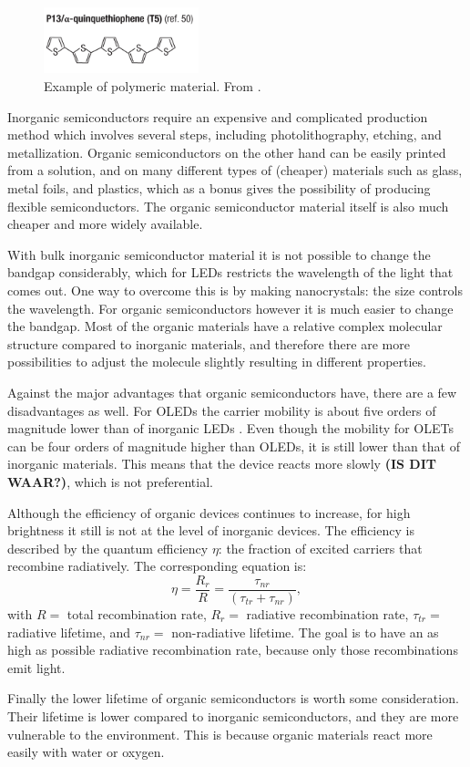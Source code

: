 \begin{figure}[!ht]
 \begin{center}
  \includegraphics[width=0.4\textwidth]{zwavelbenzeen}
  \caption{Example of polymeric material. From \citet{Muccini}.}
  \label{fig:LET}
 \end{center}
\end{figure}

Inorganic semiconductors require an expensive and complicated production method which involves several steps, including photolithography, etching, and metallization. Organic semiconductors on the other hand can be easily printed from a solution, and on many different types of (cheaper) materials such as glass, metal foils, and plastics, which as a bonus gives the possibility of producing flexible semiconductors. The organic semiconductor material itself is also much cheaper and more widely available.

With bulk inorganic semiconductor material it is not possible to change the bandgap considerably, which for LEDs restricts the wavelength of the light that comes out. One way to overcome this is by making nanocrystals: the size controls the wavelength. For organic semiconductors however it is much easier to change the bandgap. Most of the organic materials have a relative complex molecular structure compared to inorganic materials, and therefore there are more possibilities to adjust the molecule slightly resulting in different properties.

Against the major advantages that organic semiconductors have, there are a few disadvantages as well. For OLEDs the carrier mobility is about five orders of magnitude lower than of inorganic LEDs \citep{Muccini}. Even though the mobility for OLETs can be four orders of magnitude higher than OLEDs, it is still lower than that of inorganic materials. This means that the device reacts more slowly \textbf{(IS DIT WAAR?)}, which is not preferential.

Although the efficiency of organic devices continues to increase, for high brightness it still is not at the level of inorganic devices. The efficiency is described by the quantum efficiency $\eta$: the fraction of excited carriers that recombine radiatively. The corresponding equation is:
\[
 \eta = \frac{R_{r}}{R} = \frac{\tau_{nr}}{(\tau_{tr}+\tau_{nr})},
\]
with $R=$ total recombination rate, $R_{r}=$ radiative recombination rate, $\tau_{tr}=$ radiative lifetime, and $\tau_{nr}=$ non-radiative lifetime. The goal is to have an as high as possible radiative recombination rate, because only those recombinations emit light.

Finally the lower lifetime of organic semiconductors is worth some consideration. Their lifetime is lower compared to inorganic semiconductors, and they are more vulnerable to the environment. This is because organic materials react more easily with water or oxygen. 
